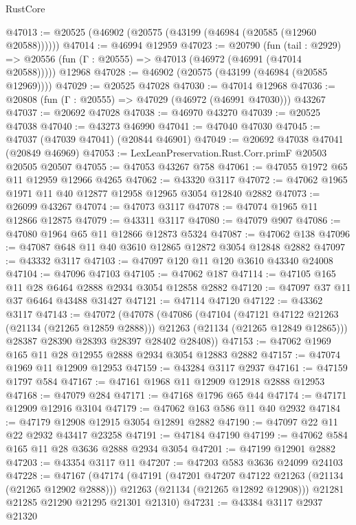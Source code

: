 \begin{lexlean}{RustCore}
\begin{coremodule}
@47013 := @20525 (@46902 (@20575 (@43199 (@46984 (@20585 (@12960 @20588))))))
@47014 := @46994 @12959
@47023 := @20790
    (fun (tail : @2929) => @20556 (fun (Γ : @20555) => @47013 (@46972 (@46991 (@47014 @20588)))))
    @12968
@47028 := @46902 (@20575 (@43199 (@46984 (@20585 @12969))))
@47029 := @20525 @47028
@47030 := @47014 @12968
@47036 := @20808 (fun (Γ : @20555) => @47029 (@46972 (@46991 @47030))) @43267
@47037 := @20692 @47028
@47038 := @46970 @43270
@47039 := @20525 @47038
@47040 := @43273 @46990
@47041 := @47040 @47030
@47045 := @47037 (@47039 @47041) (@20844 @46901)
@47049 := @20692 @47038 @47041 (@20849 @46969)
@47053 := LexLeanPreservation.Rust.Corr.primF @20503 @20505 @20507
@47055 := @47053 @43267 @758
@47061 := @47055 @1972 @65 @11 @12959 @12966 @4265
@47062 := @43320 @3117
@47072 := @47062 @1965 @1971 @11 @40 @12877 @12958 @12965 @3054 @12840 @2882
@47073 := @26099 @43267
@47074 := @47073 @3117
@47078 := @47074 @1965 @11 @12866 @12875
@47079 := @43311 @3117
@47080 := @47079 @907
@47086 := @47080 @1964 @65 @11 @12866 @12873 @5324
@47087 := @47062 @138
@47096 := @47087 @648 @11 @40 @3610 @12865 @12872 @3054 @12848 @2882
@47097 := @43332 @3117
@47103 := @47097 @120 @11 @120 @3610 @43340 @24008
@47104 := @47096 @47103
@47105 := @47062 @187
@47114 := @47105 @165 @11 @28 @6464 @2888 @2934 @3054 @12858 @2882
@47120 := @47097 @37 @11 @37 @6464 @43488 @31427
@47121 := @47114 @47120
@47122 := @43362 @3117
@47143 := @47072
    (@47078
      (@47086
        (@47104
          (@47121 @47122 @21263 (@21134 (@21265 @12859 @2888)))
          @21263
          (@21134 (@21265 @12849 @12865)))
        @28387
        @28390
        @28393
        @28397
        @28402
        @28408))
@47153 := @47062 @1969 @165 @11 @28 @12955 @2888 @2934 @3054 @12883 @2882
@47157 := @47074 @1969 @11 @12909 @12953
@47159 := @43284 @3117 @2937
@47161 := @47159 @1797 @584
@47167 := @47161 @1968 @11 @12909 @12918 @2888 @12953
@47168 := @47079 @284
@47171 := @47168 @1796 @65 @44
@47174 := @47171 @12909 @12916 @3104
@47179 := @47062 @163 @586 @11 @40 @2932
@47184 := @47179 @12908 @12915 @3054 @12891 @2882
@47190 := @47097 @22 @11 @22 @2932 @43417 @23258
@47191 := @47184 @47190
@47199 := @47062 @584 @165 @11 @28 @3636 @2888 @2934 @3054
@47201 := @47199 @12901 @2882
@47203 := @43354 @3117 @11
@47207 := @47203 @583 @3636 @24099 @24103
@47228 := @47167
    (@47174
      (@47191
        (@47201 @47207 @47122 @21263 (@21134 (@21265 @12902 @2888)))
        @21263
        (@21134 (@21265 @12892 @12908)))
      @21281
      @21285
      @21290
      @21295
      @21301
      @21310)
@47231 := @43384 @3117 @2937 @21320

\end{coremodule}
\end{lexlean}
